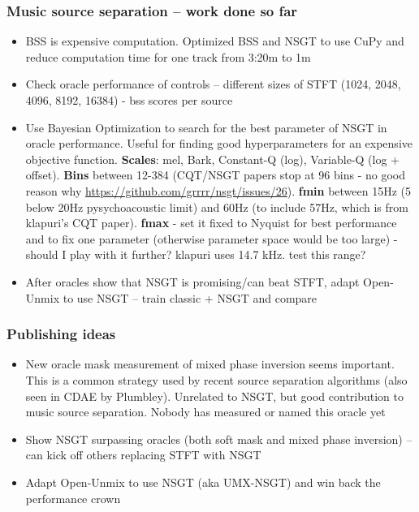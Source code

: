 \documentclass[usenames,dvipsnames]{beamer}
\begin{document}
\begin{frame}
	\frametitle{Music source separation -- work done so far}
	\begin{itemize}
		\item
			BSS is expensive computation. Optimized BSS and NSGT to use CuPy and reduce computation time for one track from 3:20m to 1m
		\item
			Check oracle performance of controls -- different sizes of STFT (1024, 2048, 4096, 8192, 16384) - bss scores per source
		\item
			Use Bayesian Optimization to search for the best parameter of NSGT in oracle performance. Useful for finding good hyperparameters for an expensive objective function. \textbf{Scales}: mel, Bark, Constant-Q (log), Variable-Q (log + offset). \textbf{Bins} between 12-384 (CQT/NSGT papers stop at 96 bins - no good reason why \href{https://github.com/grrrr/nsgt/issues/26}{https://github.com/grrrr/nsgt/issues/26}). \textbf{fmin} between 15Hz (5 below 20Hz pysychoacoustic limit) and 60Hz (to include 57Hz, which is from klapuri's CQT paper). \textbf{fmax} - set it fixed to Nyquist for best performance and to fix one parameter (otherwise parameter space would be too large) - should I play with it further? klapuri uses 14.7 kHz. test this range?
		\item
			After oracles show that NSGT is promising/can beat STFT, adapt Open-Unmix to use NSGT -- train classic + NSGT and compare
	\end{itemize}
\end{frame}

\begin{frame}
	\frametitle{Publishing ideas}
	\begin{itemize}
		\item
			New oracle mask measurement of mixed phase inversion seems important. This is a common strategy used by recent source separation algorithms (also seen in CDAE by Plumbley). Unrelated to NSGT, but good contribution to music source separation. Nobody has measured or named this oracle yet
		\item
			Show NSGT surpassing oracles (both soft mask and mixed phase inversion) -- can kick off others replacing STFT with NSGT
		\item
			Adapt Open-Unmix to use NSGT (aka UMX-NSGT) and win back the performance crown
	\end{itemize}
\end{frame}
\end{document}
